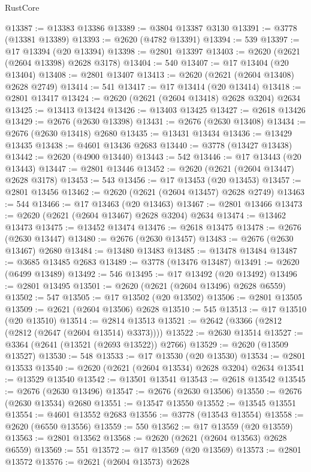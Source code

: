 \begin{lexlean}{RustCore}
\begin{coremodule}
@13387 := @13383 @13386
@13389 := @3804 @13387 @3130
@13391 := @3778 (@13381 @13389)
@13393 := @2620 (@4782 @13391)
@13394 := 539
@13397 := @17 @13394 (@20 @13394)
@13398 := @2801 @13397
@13403 := @2620 (@2621 (@2604 @13398) @2628 @3178)
@13404 := 540
@13407 := @17 @13404 (@20 @13404)
@13408 := @2801 @13407
@13413 := @2620 (@2621 (@2604 @13408) @2628 @2749)
@13414 := 541
@13417 := @17 @13414 (@20 @13414)
@13418 := @2801 @13417
@13424 := @2620 (@2621 (@2604 @13418) @2628 @3204) @2634
@13425 := @13413 @13424
@13426 := @13403 @13425
@13427 := @2618 @13426
@13429 := @2676 (@2630 @13398)
@13431 := @2676 (@2630 @13408)
@13434 := @2676 (@2630 @13418) @2680
@13435 := @13431 @13434
@13436 := @13429 @13435
@13438 := @4601 @13436 @2683
@13440 := @3778 (@13427 @13438)
@13442 := @2620 (@4900 @13440)
@13443 := 542
@13446 := @17 @13443 (@20 @13443)
@13447 := @2801 @13446
@13452 := @2620 (@2621 (@2604 @13447) @2628 @3178)
@13453 := 543
@13456 := @17 @13453 (@20 @13453)
@13457 := @2801 @13456
@13462 := @2620 (@2621 (@2604 @13457) @2628 @2749)
@13463 := 544
@13466 := @17 @13463 (@20 @13463)
@13467 := @2801 @13466
@13473 := @2620 (@2621 (@2604 @13467) @2628 @3204) @2634
@13474 := @13462 @13473
@13475 := @13452 @13474
@13476 := @2618 @13475
@13478 := @2676 (@2630 @13447)
@13480 := @2676 (@2630 @13457)
@13483 := @2676 (@2630 @13467) @2680
@13484 := @13480 @13483
@13485 := @13478 @13484
@13487 := @3685 @13485 @2683
@13489 := @3778 (@13476 @13487)
@13491 := @2620 (@6499 @13489)
@13492 := 546
@13495 := @17 @13492 (@20 @13492)
@13496 := @2801 @13495
@13501 := @2620 (@2621 (@2604 @13496) @2628 @6559)
@13502 := 547
@13505 := @17 @13502 (@20 @13502)
@13506 := @2801 @13505
@13509 := @2621 (@2604 @13506) @2628
@13510 := 545
@13513 := @17 @13510 (@20 @13510)
@13514 := @2814 @13513
@13521 := @2642 (@3366 (@2812 (@2812 (@2647 (@2604 @13514) @3373))))
@13522 := @2630 @13514
@13527 := @3364 (@2641 (@13521 (@2693 @13522)) @2766)
@13529 := @2620 (@13509 @13527)
@13530 := 548
@13533 := @17 @13530 (@20 @13530)
@13534 := @2801 @13533
@13540 := @2620 (@2621 (@2604 @13534) @2628 @3204) @2634
@13541 := @13529 @13540
@13542 := @13501 @13541
@13543 := @2618 @13542
@13545 := @2676 (@2630 @13496)
@13547 := @2676 (@2630 @13506)
@13550 := @2676 (@2630 @13534) @2680
@13551 := @13547 @13550
@13552 := @13545 @13551
@13554 := @4601 @13552 @2683
@13556 := @3778 (@13543 @13554)
@13558 := @2620 (@6550 @13556)
@13559 := 550
@13562 := @17 @13559 (@20 @13559)
@13563 := @2801 @13562
@13568 := @2620 (@2621 (@2604 @13563) @2628 @6559)
@13569 := 551
@13572 := @17 @13569 (@20 @13569)
@13573 := @2801 @13572
@13576 := @2621 (@2604 @13573) @2628

\end{coremodule}
\end{lexlean}
